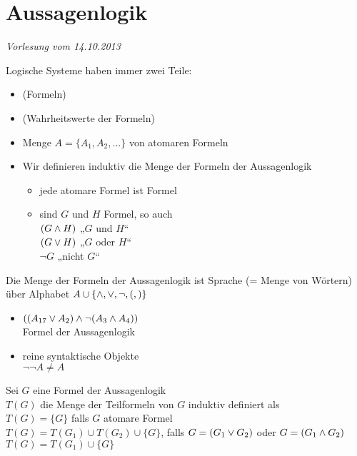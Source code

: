 
\section{Aussagenlogik}

\begin{flushright}
\textit{Vorlesung vom 14.10.2013}
\end{flushright}

Logische Systeme haben immer zwei Teile:
\begin{itemize}
\item {} (Formeln)
\item {} (Wahrheitswerte der Formeln)
\end{itemize}

\begin{itemize}
\item Menge $A = \{ A_1, A_2, ... \}$ von atomaren Formeln
\item Wir definieren induktiv die Menge der Formeln der Aussagenlogik
    \begin{itemize}
        \item jede atomare Formel ist Formel
        \item sind $G$ und $H$ Formel, so auch \\
$( G \wedge H )$ „$G$ und $H$“ \\
$(G \vee H)$ „$G$ oder $H$“ \\
$\neg G$ „nicht $G$“
    \end{itemize}
\end{itemize}

\bemerkung{}
Die Menge der Formeln der Aussagenlogik ist Sprache (= Menge von Wörtern) über Alphabet $A \cup \{\wedge, \vee, \neg, (, ) \}$\\

\beispiel{}
\begin{itemize}
\item $ \left( ( A_{17} \vee A_2 ) \wedge \neg (A_3 \wedge A_4) \right)$\\
    Formel der Aussagenlogik
\item reine syntaktische Objekte\\
    $\neg \neg A \neq A$
\end{itemize}

\beweis{}
Sei $G$ eine Formel der Aussagenlogik\\
$T(G)$ die Menge der Teilformeln von $G$ induktiv definiert als\\
$T(G) = \{ G \}$ falls $G$ atomare Formel\\
$T(G) = T(G_1) \cup T(G_2) \cup \{G\}$, falls $G = (G_1 \vee G_2)$ oder $G=(G_1 \wedge G_2)$\\
$T(G)=T(G_1) \cup \{G\}$\\

